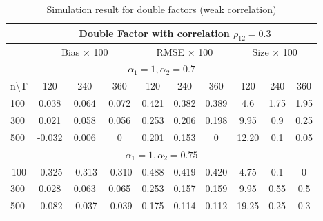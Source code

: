 	\begin{table}[]
		\caption{Simulation result for double factors (weak correlation)}\label{table:exp3}
		\centering
	\begin{tabular}{lccccccccc}
		\hline
		\hline
		\multicolumn{1}{l|}{}                   & \multicolumn{9}{c}{Double Factor with correlation $\rho_{12} = 0.3$}                                                               \\ \hline
		\multicolumn{1}{l|}{}                   & \multicolumn{3}{c|}{Bias $\times$ 100}        & \multicolumn{3}{c|}{RMSE $\times$ 100}     & \multicolumn{3}{c}{Size $\times$ 100} \\ \hline
		\multicolumn{10}{c}{$\alpha_1 = 1, \alpha_2 = 0.7$}                                                                                                                            \\ \hline
		\multicolumn{1}{l|}{n\textbackslash{}T} & 120    & 240    & \multicolumn{1}{c|}{360}    & 120   & 240   & \multicolumn{1}{c|}{360}   & 120          & 240        & 360        \\ \hline
		\multicolumn{1}{l|}{100}                & 0.038  & 0.064  & \multicolumn{1}{c|}{0.072}  & 0.421 & 0.382 & \multicolumn{1}{c|}{0.389} & 4.6          & 1.75       & 1.95       \\
		\multicolumn{1}{l|}{300}                & 0.021  & 0.058  & \multicolumn{1}{c|}{0.056}  & 0.253 & 0.206 & \multicolumn{1}{c|}{0.198} & 9.95         & 0.9        & 0.25       \\
		\multicolumn{1}{l|}{500}                & -0.032 & 0.006  & \multicolumn{1}{c|}{0}      & 0.201 & 0.153 & \multicolumn{1}{c|}{0}     & 12.20        & 0.1        & 0.05       \\ \hline
		\multicolumn{10}{c}{$\alpha_1 = 1, \alpha_2 = 0.75$}                                                                                                                          \\ \hline
		\multicolumn{1}{c|}{100}                & -0.325 & -0.313 & \multicolumn{1}{c|}{-0.310} & 0.488 & 0.419 & \multicolumn{1}{c|}{0.420} & 4.75         & 0.1        & 0          \\
		\multicolumn{1}{l|}{300}                & 0.028  & 0.063  & \multicolumn{1}{c|}{0.065}  & 0.253 & 0.157 & \multicolumn{1}{c|}{0.159} & 9.95         & 0.55       & 0.5        \\
		\multicolumn{1}{l|}{500}                & -0.082 & -0.037 & \multicolumn{1}{c|}{-0.039} & 0.175 & 0.114 & \multicolumn{1}{c|}{0.112} & 19.25        & 0.25       & 0.3        \\ \hline

\end{tabular}
\end{table}
